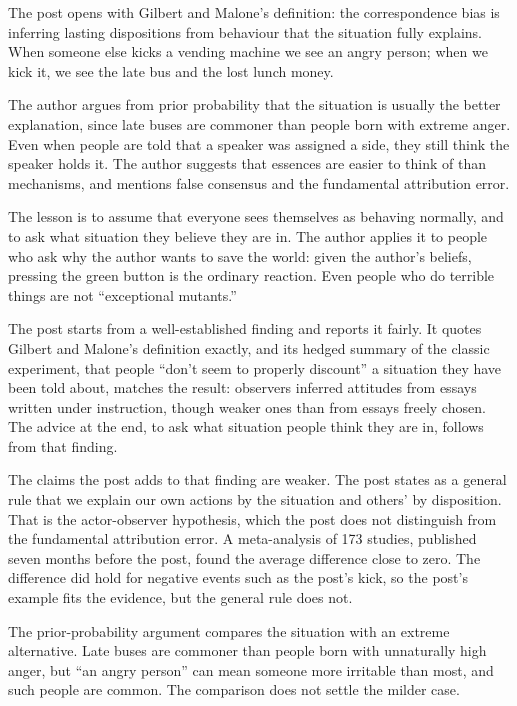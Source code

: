 \begin{afterword}
\summaryhead

The post opens with Gilbert and Malone's definition: the correspondence bias is inferring lasting dispositions from behaviour that the situation fully explains. When someone else kicks a vending machine we see an angry person; when we kick it, we see the late bus and the lost lunch money.

The author argues from prior probability that the situation is usually the better explanation, since late buses are commoner than people born with extreme anger. Even when people are told that a speaker was assigned a side, they still think the speaker holds it. The author suggests that essences are easier to think of than mechanisms, and mentions false consensus and the fundamental attribution error.

The lesson is to assume that everyone sees themselves as behaving normally, and to ask what situation they believe they are in. The author applies it to people who ask why the author wants to save the world: given the author's beliefs, pressing the green button is the ordinary reaction. Even people who do terrible things are not ``exceptional mutants.''

\responsehead

The post starts from a well-established finding and reports it fairly. It quotes Gilbert and Malone's definition exactly, and its hedged summary of the classic experiment, that people ``don't seem to properly discount'' a situation they have been told about, matches the result: observers inferred attitudes from essays written under instruction, though weaker ones than from essays freely chosen. The advice at the end, to ask what situation people think they are in, follows from that finding.

The claims the post adds to that finding are weaker. The post states as a general rule that we explain our own actions by the situation and others' by disposition. That is the actor-observer hypothesis, which the post does not distinguish from the fundamental attribution error. A meta-analysis of 173 studies, published seven months before the post, found the average difference close to zero. The difference did hold for negative events such as the post's kick, so the post's example fits the evidence, but the general rule does not.

The prior-probability argument compares the situation with an extreme alternative. Late buses are commoner than people born with unnaturally high anger, but ``an angry person'' can mean someone more irritable than most, and such people are common. The comparison does not settle the milder case.


\end{afterword}
